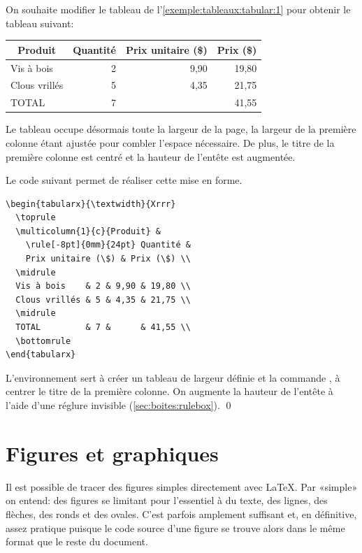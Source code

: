 \begin{exemple}
  \label{exemple:tableaux:tabular:2}
  On souhaite modifier le tableau de
  l'\autoref{exemple:tableaux:tabular:1}  pour obtenir le tableau
  suivant:
  \begin{center}
    \begin{tabularx}{\textwidth}{Xrrr}
      \toprule
      \multicolumn{1}{c}{Produit} &
      \rule[-8pt]{0mm}{24pt} Quantité & Prix unitaire (\$) & Prix (\$) \\
      \midrule
      Vis à bois    & 2 & 9,90 & 19,80 \\
      Clous vrillés & 5 & 4,35 & 21,75 \\
      \midrule
      TOTAL         & 7 &      & 41,55 \\
      \bottomrule
    \end{tabularx}
  \end{center}
  Le tableau occupe désormais toute la largeur de la page, la largeur
  de la première colonne étant ajustée pour combler l'espace
  nécessaire. De plus, le titre de la première colonne est centré et
  la hauteur de l'entête est augmentée.

  Le code suivant permet de réaliser cette mise en forme.
\begin{lstlisting}
\begin{tabularx}{\textwidth}{Xrrr}
  \toprule
  \multicolumn{1}{c}{Produit} &
    \rule[-8pt]{0mm}{24pt} Quantité &
    Prix unitaire (\$) & Prix (\$) \\
  \midrule
  Vis à bois    & 2 & 9,90 & 19,80 \\
  Clous vrillés & 5 & 4,35 & 21,75 \\
  \midrule
  TOTAL         & 7 &      & 41,55 \\
  \bottomrule
\end{tabularx}
\end{lstlisting}
  L'environnement  sert à créer un tableau de largeur
  définie et la commande \cmd{\multicolumn}, à centrer le titre de la
  première colonne. On augmente la hauteur de l'entête à l'aide d'une
  réglure invisible (\autoref{sec:boites:rulebox}). %
  \qed
\end{exemple}


\section{Figures et graphiques}
\label{sec:tableaux:figures}

Il est possible de tracer des figures simples directement avec
{\LaTeX}. Par «simple» on entend: des figures se limitant pour
l'essentiel à du texte, des lignes, des flèches, des ronds et des
ovales. C'est parfois amplement suffisant et, en définitive, assez
pratique puisque le code source d'une figure se trouve alors dans le
même format que le reste du document.

